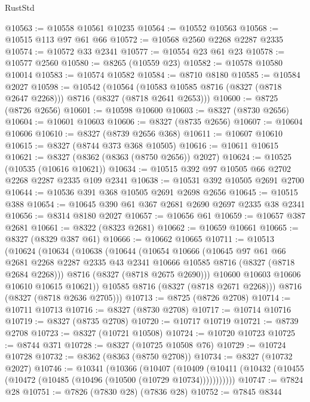 \begin{lexlean}{RustStd}
\begin{coremodule}
{\begin{coremodule}
{{{{{{{{{{{{{{{{{{{{{{{{{{{{{{{{{{{{{{{{{{{{{{{{{{{{{{@10563 := @10558 @10561 @10235
@10564 := @10552 @10563
@10568 := @10515 @113 @97 @61 @66
@10572 := @10568 @2560 @2268 @2287 @2335
@10574 := @10572 @33 @2341
@10577 := @10554 @23 @61 @23
@10578 := @10577 @2560
@10580 := @8265 (@10559 @23)
@10582 := @10578 @10580 @10014
@10583 := @10574 @10582
@10584 := @8710 @8180
@10585 := @10584 @2027
@10598 := @10542
    (@10564 (@10583 @10585 @8716 (@8327 (@8718 @2647 @2268))) @8716 (@8327 (@8718 @2641 @2653)))
@10600 := @8725 (@8726 @2656)
@10601 := @10598 @10600
@10603 := @8327 (@8730 @2656)
@10604 := @10601 @10603
@10606 := @8327 (@8735 @2656)
@10607 := @10604 @10606
@10610 := @8327 (@8739 @2656 @368)
@10611 := @10607 @10610
@10615 := @8327 (@8744 @373 @368 @10505)
@10616 := @10611 @10615
@10621 := @8327 (@8362 (@8363 (@8750 @2656)) @2027)
@10624 := @10525 (@10535 (@10616 @10621))
@10634 := @10515 @392 @97 @10505 @66 @2702 @2268 @2287 @2335 @109 @2341
@10638 := @10531 @392 @10505 @2691 @2700
@10644 := @10536 @391 @368 @10505 @2691 @2698 @2656
@10645 := @10515 @388
@10654 := @10645 @390 @61 @367 @2681 @2690 @2697 @2335 @38 @2341
@10656 := @8314 @8180 @2027
@10657 := @10656 @61
@10659 := @10657 @387 @2681
@10661 := @8322 (@8323 @2681)
@10662 := @10659 @10661
@10665 := @8327 (@8329 @387 @61)
@10666 := @10662 @10665
@10711 := @10513
    (@10624
      (@10634
        (@10638
          (@10644
            (@10654
              @10666
              (@10645
                @97
                @61
                @66
                @2681
                @2268
                @2287
                @2335
                @43
                @2341
                @10666
                @10585
                @8716
                (@8327 (@8718 @2684 @2268)))
              @8716
              (@8327 (@8718 @2675 @2690)))
            @10600
            @10603
            @10606
            @10610
            @10615
            @10621))
        @10585
        @8716
        (@8327 (@8718 @2671 @2268)))
      @8716
      (@8327 (@8718 @2636 @2705)))
@10713 := @8725 (@8726 @2708)
@10714 := @10711 @10713
@10716 := @8327 (@8730 @2708)
@10717 := @10714 @10716
@10719 := @8327 (@8735 @2708)
@10720 := @10717 @10719
@10721 := @8739 @2708
@10723 := @8327 (@10721 @10508)
@10724 := @10720 @10723
@10725 := @8744 @371
@10728 := @8327 (@10725 @10508 @76)
@10729 := @10724 @10728
@10732 := @8362 (@8363 (@8750 @2708))
@10734 := @8327 (@10732 @2027)
@10746 := @10341
    (@10366
      (@10407
        (@10409 (@10411 (@10432 (@10455 (@10472 (@10485 (@10496 (@10500 (@10729 @10734)))))))))))
@10747 := @7824 @28
@10751 := @7826 (@7830 @28) (@7836 @28)
@10752 := @7845 @8344
}}}}}}}}}}}}}}}}}}}}}}}}}}}}}}}}}}}}}}}}}}}}}}}}}}}}}}
\end{coremodule}}
\end{coremodule}
\end{lexlean}
